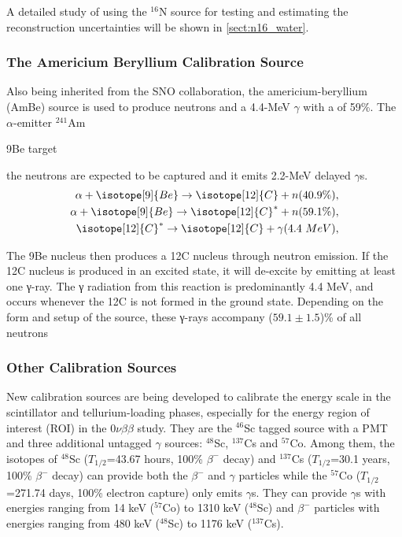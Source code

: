 
A detailed study of using the $^{16}$N source for testing and estimating the reconstruction uncertainties will be shown in \ref{sect:n16_water}.

\subsubsection{The Americium Beryllium Calibration Source}\label{sect:AmBesource}
Also being inherited from the SNO collaboration, the americium-beryllium (AmBe) source 
is used to produce neutrons and a 4.4-MeV $\gamma$ with a of 59\%. The $\alpha$-emitter $^{241}$Am  


  9Be target

the neutrons are expected to be captured and it emits 2.2-MeV delayed $\gamma$s. 
\begin{equation}
\begin{split}
\alpha + \isotope[9]{Be} \to \isotope[12]{C} + n (40.9\%),\\
\alpha + \isotope[9]{Be} \to \isotope[12]{C}^* + n (59.1\%),\\
\isotope[12]{C}^* \to \isotope[12]{C} + \gamma (4.4~MeV),\\
\end{split}
\end{equation}

The 9Be nucleus then produces a 12C nucleus through neutron emission. If the 12C nucleus is produced
in an excited state, it will de-excite by emitting at least one γ-ray. The γ radiation from this reaction is
predominantly 4.4 MeV, and occurs whenever the 12C is not formed in the ground state. Depending on the
form and setup of the source, these γ-rays accompany ($59.1\pm 1.5$)\% of all neutrons 

\subsubsection{Other Calibration Sources}

New calibration sources are being developed to calibrate the energy scale in the scintillator and tellurium-loading phases, especially for the energy region of interest (ROI) in the $0\nu\beta\beta$ study. They are the $^{46}$Sc tagged source with a PMT and three additional untagged $\gamma$ sources: $^{48}$Sc, $^{137}$Cs and $^{57}$Co\cite{snop_jinst}. Among them, the isotopes of $^{48}$Sc ($T_{1/2}$=43.67 hours, 100\% $\beta^-$ decay) and $^{137}$Cs ($T_{1/2}$=30.1 years, 100\% $\beta^-$ decay) can provide both the $\beta^-$ and $\gamma$ particles while the $^{57}$Co  ($T_{1/2}$=271.74 days, 100\% electron capture) only emits $\gamma$s. They can provide $\gamma$s with energies ranging from 14 keV ($^{57}$Co) to 1310 keV ($^{48}$Sc) and $\beta^-$ particles with energies ranging from 480 keV ($^{48}$Sc) to 1176 keV ($^{137}$Cs)\cite{nndc}.

